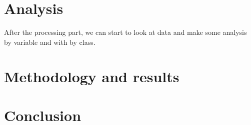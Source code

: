 \documentclass[12pt]{article}
\begin{document}
\section{Analysis}
After the processing part, we can start to look at data and make some analysis by variable and with by class.
\section{Methodology and results}
\section{Conclusion}
\end{document}
